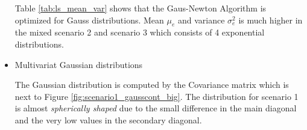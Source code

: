 \documentclass{article}
\begin{document}
\begin{itemize}
    Table \ref{tab:ls_mean_var} shows that the Gaus-Newton Algorithm is optimized for Gauss distributions. Mean $\mu_{e}$ and variance $\sigma^2_{e}$ is much higher in the mixed scenario 2 and scenario 3 which consists of 4 exponential distributions.
        
    \newpage
    
    \item Multivariat Gaussian distributions\\
  
        \begin{figure}[hbt!]
        \begin{floatrow}
		\label{tab:scenario1_covariance}
		\end{floatrow}
		\end{figure}
		
		The Gaussian distribution is computed by the Covariance matrix which is next to Figure \ref{fig:scenario1_gausscont_big}. The distribution for scenario 1 is almost \textit{spherically shaped} due to the small difference in the main diagonal and the very low values in the secondary diagonal. 
		

\end{itemize}
\end{document}
